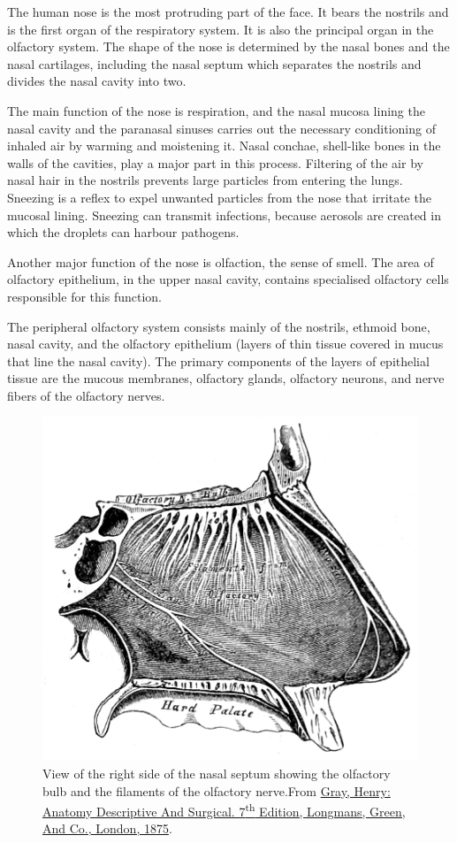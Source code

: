 The human nose is the most protruding part of the face. It bears the nostrils and is the first organ of the respiratory system. It is also the principal organ in the olfactory system. The shape of the nose is determined by the nasal bones and the nasal cartilages, including the nasal septum which separates the nostrils and divides the nasal cavity into two.

The main function of the nose is respiration, and the nasal mucosa lining the nasal cavity and the paranasal sinuses carries out the necessary conditioning of inhaled air by warming and moistening it. Nasal conchae, shell-like bones in the walls of the cavities, play a major part in this process. Filtering of the air by nasal hair in the nostrils prevents large particles from entering the lungs. Sneezing is a reflex to expel unwanted particles from the nose that irritate the mucosal lining. Sneezing can transmit infections, because aerosols are created in which the droplets can harbour pathogens.

Another major function of the nose is olfaction, the sense of smell. The area of olfactory epithelium, in the upper nasal cavity, contains specialised olfactory cells responsible for this function.

The peripheral olfactory system consists mainly of the nostrils, ethmoid bone, nasal cavity, and the olfactory epithelium (layers of thin tissue covered in mucus that line the nasal cavity). The primary components of the layers of epithelial tissue are the mucous membranes, olfactory glands, olfactory neurons, and nerve fibers of the olfactory nerves.



\begin{figure}

{\centering \includegraphics[width=0.7\linewidth]{./figures/olfactory/GrayP572} 

}

\caption{View of the right side of the nasal septum showing the olfactory bulb and the filaments of the olfactory nerve.From \href{https://wellcomelibrary.org/item/b21688692}{Gray, Henry: Anatomy Descriptive And Surgical. 7\textsuperscript{th} Edition, Longmans, Green, And Co., London, 1875}.}\label{fig:rightseptum}
\end{figure}

